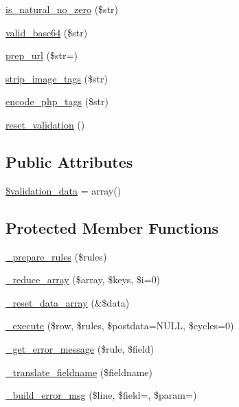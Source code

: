 \begin{DoxyCompactItemize}
\mbox{\hyperlink{class_c_i___form__validation_ae4f399db6305e565bcf9acd70eea86a6}{is\+\_\+natural\+\_\+no\+\_\+zero}} (\$str)
\item 
\mbox{\hyperlink{class_c_i___form__validation_a9bec2f0a508e0327d4b048ecfc204522}{valid\+\_\+base64}} (\$str)
\item 
\mbox{\hyperlink{class_c_i___form__validation_a1218a70d68fe797013a53b3c7cd41d2f}{prep\+\_\+url}} (\$str=\textquotesingle{}\textquotesingle{})
\item 
\mbox{\hyperlink{class_c_i___form__validation_abb836a42971c7bc641588db779c6ab1d}{strip\+\_\+image\+\_\+tags}} (\$str)
\item 
\mbox{\hyperlink{class_c_i___form__validation_ae8fff4cb083a2a66c900f8bd61216bdd}{encode\+\_\+php\+\_\+tags}} (\$str)
\item 
\mbox{\hyperlink{class_c_i___form__validation_a84b8bd64032f6be532968015cba11361}{reset\+\_\+validation}} ()
\end{DoxyCompactItemize}
\subsection*{Public Attributes}
\begin{DoxyCompactItemize}
\item 
\mbox{\hyperlink{class_c_i___form__validation_af1df05337bb40c1d30c3d8c62fe8696c}{\$validation\+\_\+data}} = array()
\end{DoxyCompactItemize}
\subsection*{Protected Member Functions}
\begin{DoxyCompactItemize}
\item 
\mbox{\hyperlink{class_c_i___form__validation_ada388c3a7f360165699597f638faf127}{\+\_\+prepare\+\_\+rules}} (\$rules)
\item 
\mbox{\hyperlink{class_c_i___form__validation_a20ed7e44a35f5a5f6db5a6b220151df0}{\+\_\+reduce\+\_\+array}} (\$array, \$keys, \$i=0)
\item 
\mbox{\hyperlink{class_c_i___form__validation_a4fcb908ec146828bb378d1658e5b517a}{\+\_\+reset\+\_\+data\+\_\+array}} (\&\$data)
\item 
\mbox{\hyperlink{class_c_i___form__validation_a00fc7d98650d07098dd4a13b486c3dea}{\+\_\+execute}} (\$row, \$rules, \$postdata=N\+U\+LL, \$cycles=0)
\item 
\mbox{\hyperlink{class_c_i___form__validation_a1c0eda169a1c36fe0bcc61a863690297}{\+\_\+get\+\_\+error\+\_\+message}} (\$rule, \$field)
\item 
\mbox{\hyperlink{class_c_i___form__validation_ae6b1edc93754376c05622d905845c215}{\+\_\+translate\+\_\+fieldname}} (\$fieldname)
\item 
\mbox{\hyperlink{class_c_i___form__validation_a970cb9f78d6cefc93e795d4d72e085af}{\+\_\+build\+\_\+error\+\_\+msg}} (\$line, \$field=\textquotesingle{}\textquotesingle{}, \$param=\textquotesingle{}\textquotesingle{})
\end{DoxyCompactItemize}
